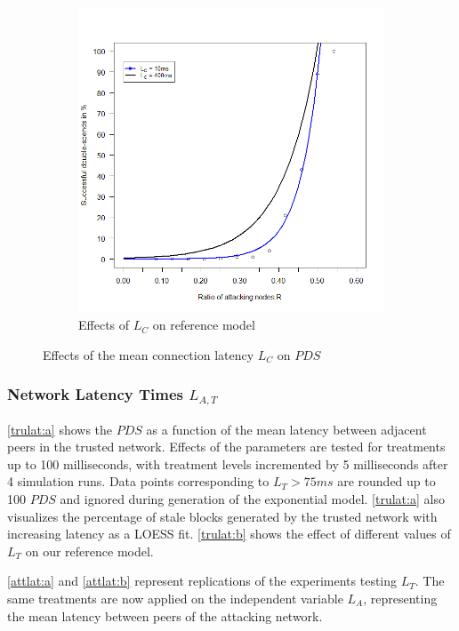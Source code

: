 \documentclass[a4paper,12pt,twoside]{report}
\begin{document}
\begin{figure}[hb!]
\begin{subfigure}{.5\textwidth}
  \includegraphics[width=\linewidth]{Experiments/ConnLatency/conrat.png}
  \caption{Effects of $L_{C}$ on reference model}
  \label{conn:b}
\end{subfigure}
\caption{Effects of the mean connection latency $L_{C}$ on $PDS$}
\label{conn}
\end{figure}

\subsubsection{Network Latency Times $L_{A,T}$}
\autoref{trulat:a} shows the $PDS$ as a function of the mean latency between adjacent peers in the trusted network. Effects of the parameters are tested for treatments up to 100 milliseconds, with treatment levels incremented by 5 milliseconds after 4 simulation runs. Data points corresponding to $L_T > 75ms$ are rounded up to 100 $PDS$ and ignored during generation of the exponential model. \autoref{trulat:a} also visualizes the percentage of stale blocks generated by the trusted network with increasing latency as a LOESS fit. \autoref{trulat:b} shows the effect of different values of $L_T$ on our reference model.

\autoref{attlat:a} and \autoref{attlat:b} represent replications of the experiments testing $L_T$. The same treatments are now applied on the independent variable $L_A$, representing the mean latency between peers of the attacking network.
\end{document}
